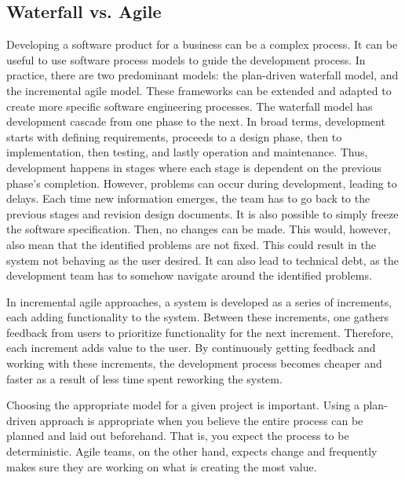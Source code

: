 
\subsection{Waterfall vs. Agile}
Developing a software product for a business can be a complex process.
It can be useful to use software process models to guide the development process.
In practice, there are two predominant models: the plan-driven waterfall model, and the incremental agile model.
These frameworks can be extended and adapted to create more specific software engineering processes.\cite{sommervilleSoftwareEngineering2016}
The waterfall model has development cascade from one phase to the next.
In broad terms, development starts with defining requirements, proceeds to a design phase, then to implementation, then testing, and lastly operation and maintenance.
Thus, development happens in stages where each stage is dependent on the previous phase's completion.
However, problems can occur during development, leading to delays.
Each time new information emerges, the team has to go back to the previous stages and revision design documents.
It is also possible to simply freeze the software specification. Then, no changes can be made. 
This would, however, also mean that the identified problems are not fixed. This could result in the system not behaving as the user desired. 
It can also lead to technical debt, as the development team has to somehow navigate around the identified problems.

In incremental agile approaches, a system is developed as a series of increments, each adding functionality to the system. 
Between these increments, one gathers feedback from users to prioritize functionality for the next increment. Therefore, each increment adds value to the user. 
By continuously getting feedback and working with these increments, the development process becomes cheaper and faster as a result of less time spent reworking the system.\cite{sommervilleSoftwareEngineering2016}

Choosing the appropriate model for a given project is important.
Using a plan-driven approach is appropriate when you believe the entire process can be planned and laid out beforehand. 
That is, you expect the process to be deterministic.
Agile teams, on the other hand, expects change and frequently makes sure they are working on what is creating the most value.


